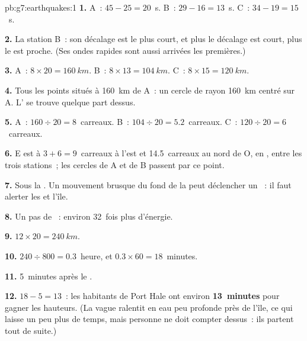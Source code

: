 \begin{solution}{pb:g7:earthquakes:1}
\textbf{1.} A~: $45 - 25 = 20$~s. B~: $29 - 16 = 13$~s. C~: $34 - 19 =
15$~s.

\textbf{2.} La station B~: son décalage est le plus court, et plus le
décalage est court, plus le  est proche. (Ses ondes rapides sont
aussi arrivées les premières.)

\textbf{3.} A~: $8 \times 20 = \qty{160}{km}$. B~: $8 \times 13 =
\qty{104}{km}$. C~: $8 \times 15 = \qty{120}{km}$.

\textbf{4.} Tous les points situés à \qty{160}{km} de A~: un cercle de
rayon \qty{160}{km} centré sur A. L' se trouve quelque part
dessus.

\textbf{5.} A~: $160 \div 20 = 8$~carreaux. B~: $104 \div 20 = 5.2$~carreaux.
C~: $120 \div 20 = 6$~carreaux.

\textbf{6.} E est à $3 + 6 = 9$~carreaux à l'est et 14.5~carreaux au nord
de O, en , entre les trois stations~; les cercles de A et de B passent
par ce point.

\textbf{7.} Sous la . Un mouvement brusque du fond de la  peut
déclencher un ~: il faut alerter les  et l'île.

\textbf{8.} Un pas de ~: environ 32~fois plus d'énergie.

\textbf{9.} $12 \times 20 = \qty{240}{km}$.

\textbf{10.} $240 \div 800 = 0.3$~heure, et $0.3 \times 60 = 18$~minutes.

\textbf{11.} 5~minutes après le .

\textbf{12.} $18 - 5 = 13$~: les habitants de Port Hale ont environ
\textbf{13~minutes} pour gagner les hauteurs. (La vague ralentit en eau
peu profonde près de l'île, ce qui laisse un peu plus de temps, mais
personne ne doit compter dessus~: ils partent tout de suite.)
\end{solution}
